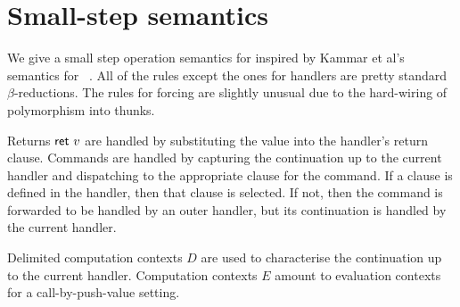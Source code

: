 \section{Small-step semantics}
\label{sec:semantics}

We give a small step operation semantics for \feff inspired by Kammar
et al's semantics for \lameff~\cite{KammarLO13}.
%
All of the rules except the ones for handlers are pretty standard
$\beta$-reductions.
%
The rules for forcing are slightly unusual due to the hard-wiring of
polymorphism into thunks.

Returns $\mathsf{ret}~v$ are handled by substituting the value into the
handler's return clause. Commands are handled by capturing the
continuation up to the current handler and dispatching to the
appropriate clause for the command. If a clause is defined in the
handler, then that clause is selected. If not, then the command is
forwarded to be handled by an outer handler, but its continuation is
handled by the current handler.

Delimited computation contexts $D$ are used to characterise the
continuation up to the current handler. Computation contexts $E$
amount to evaluation contexts for a call-by-push-value setting.

